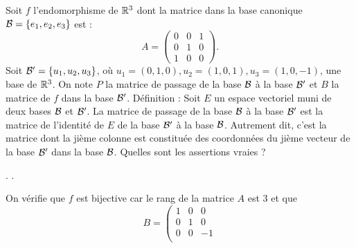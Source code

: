 \begin{question}
Soit $f$ l'endomorphisme de $\Rr^3$ dont la matrice dans la base canonique ${\cal B}=\{e_1,e_2,e_3\}$ est : 
$$A=\left(\begin{array}{rcc}0&0&1\\0&1&0\\ 
1&0&0\end{array}\right).$$
Soit ${\cal B}' = \{ u_1, u_2,  u_3\}$, où $u_1=(0,1,0), u_2=(1,0,1), u_3=(1,0,-1)$, une base de $\Rr^3$. On note $P$ la matrice de passage de la base ${\cal B}$ à la base ${\cal B}'$ et $B$ la matrice de $f$ dans la base ${\cal B}'$.
\vskip0mm
Définition : Soit $E$ un espace vectoriel muni de deux bases ${\cal {B}}$ et ${\cal {B}}'$. La matrice de passage de la base ${\cal {B}}$ à la base ${\cal {B}}'$ est la matrice de l'identité de $E$ de la base ${\cal {B}}'$ à la base ${\cal {B}}$. Autrement dit, c'est la matrice dont la jième colonne est constituée des coordonnées du jième vecteur de la base ${\cal {B}'}$ dans la base ${\cal {B}}$.
\vskip0mm
Quelles sont les assertions vraies ?
\begin{answers}  
.
.
\end{answers}
\vskip2mm
\begin{explanations} On vérifie que $f$ est bijective car le rang de la matrice $A$ est $3$ et que 
$$B= \left(\begin{array}{rcc}
1&0&0\\
0&1&0\\ 
0&0&-1\\

\end{array}$$
\end{explanations}
\end{question}
